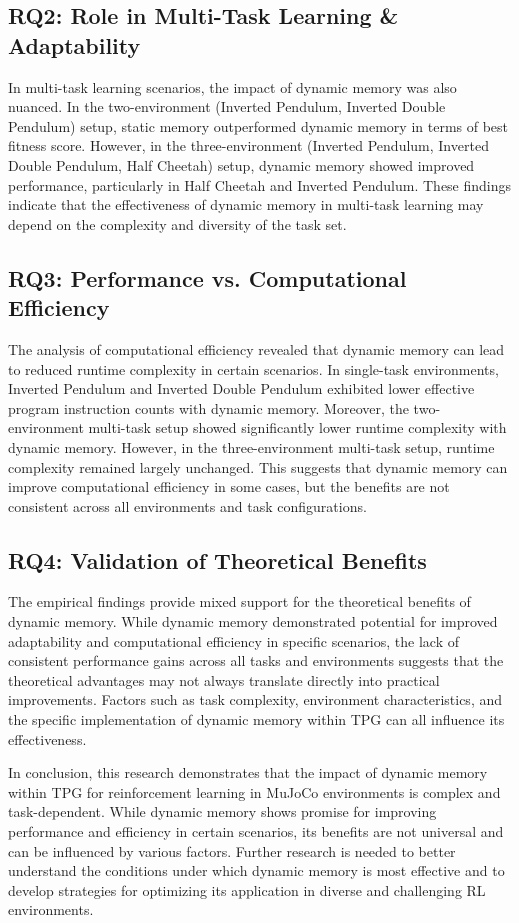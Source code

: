 \documentclass[sigconf]{acmart}
\begin{document}
\subsection{RQ2: Role in Multi-Task Learning \& Adaptability}
In multi-task learning scenarios, the impact of dynamic memory was also nuanced. In the two-environment (Inverted Pendulum, Inverted Double Pendulum) setup, static memory outperformed dynamic memory in terms of best fitness score. However, in the three-environment (Inverted Pendulum, Inverted Double Pendulum, Half Cheetah) setup, dynamic memory showed improved performance, particularly in Half Cheetah and Inverted Pendulum. These findings indicate that the effectiveness of dynamic memory in multi-task learning may depend on the complexity and diversity of the task set.

\subsection{RQ3: Performance vs. Computational Efficiency}
The analysis of computational efficiency revealed that dynamic memory can lead to reduced runtime complexity in certain scenarios. In single-task environments, Inverted Pendulum and Inverted Double Pendulum exhibited lower effective program instruction counts with dynamic memory.  Moreover, the two-environment multi-task setup showed significantly lower runtime complexity with dynamic memory. However, in the three-environment multi-task setup, runtime complexity remained largely unchanged.  This suggests that dynamic memory can improve computational efficiency in some cases, but the benefits are not consistent across all environments and task configurations.

\subsection{RQ4: Validation of Theoretical Benefits}
The empirical findings provide mixed support for the theoretical benefits of dynamic memory. While dynamic memory demonstrated potential for improved adaptability and computational efficiency in specific scenarios, the lack of consistent performance gains across all tasks and environments suggests that the theoretical advantages may not always translate directly into practical improvements. Factors such as task complexity, environment characteristics, and the specific implementation of dynamic memory within TPG can all influence its effectiveness.

In conclusion, this research demonstrates that the impact of dynamic memory within TPG for reinforcement learning in MuJoCo environments is complex and task-dependent. While dynamic memory shows promise for improving performance and efficiency in certain scenarios, its benefits are not universal and can be influenced by various factors. Further research is needed to better understand the conditions under which dynamic memory is most effective and to develop strategies for optimizing its application in diverse and challenging RL environments.
\end{document}
